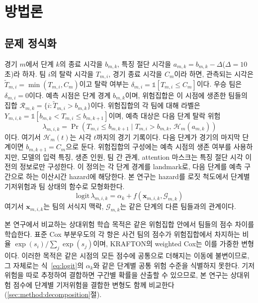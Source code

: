 \section{방법론}
\label{sec:method}


\subsection{문제 정식화}
\label{sec:method:formulation}

경기 $m$에서 단계 $k$의 종료 시각을 $b_{m,k}$, 특징 절단 시각을 $a_{m,k}=b_{m,k}-\Delta$($\Delta=10$초)라 하자.
팀 $i$의 탈락 시각을 $T_{m,i}$, 경기 종료 시각을 $C_m$이라 하면, 관측되는 시각은 $\widetilde T_{m,i}=\min(T_{m,i},C_m)$이고 탈락 여부는 $\delta_{m,i}=\mathbb{1}[T_{m,i}\le C_m]$이다. 우승 팀은 $\delta_{m,i}=0$이다.
예측 시점은 단계 경계 $b_{m,k}$이며, 위험집합은 이 시점에 생존한 팀들의 집합 $\mathcal{R}_{m,k}=\{i:\widetilde T_{m,i}>b_{m,k}\}$이다.
위험집합의 각 팀에 대해 라벨은 $Y_{m,i,k}=\mathbb{1}[b_{m,k}<T_{m,i}\le b_{m,k+1}]$이며, 예측 대상은 다음 단계 탈락 위험
\begin{equation}
\lambda_{m,i,k}=\Pr\!\left(T_{m,i}\le b_{m,k+1} \mid T_{m,i}>b_{m,k},\,\mathcal{H}_{m}(a_{m,k})\right)
\label{eq:hazard}
\end{equation}
이다. 여기서 $\mathcal{H}_{m}(t)$는 시각 $t$까지의 경기 기록이다.
다음 단계가 경기의 마지막 단계이면 $b_{m,k+1}=C_m$으로 둔다.
위험집합의 구성에는 예측 시점의 생존 여부를 사용하지만, 모델의 입력 특징, 생존 인원, 팀 간 관계, attention 마스크는 특징 절단 시각 이전의 정보로만 구성한다.
이 정의는 각 단계 경계를 landmark로, 다음 단계를 예측 구간으로 하는 이산시간 hazard에 해당한다.
본 연구는 hazard를 로짓 척도에서 단계별 기저위험과 팀 상태의 함수로 모형화한다.
\begin{equation}
\mathrm{logit}\,\lambda_{m,i,k}=\alpha_k+f(\mathbf{x}_{m,i,k},\mathcal{G}_{m,k})
\label{eq:logit}
\end{equation}
여기서 $\mathbf{x}_{m,i,k}$는 팀의 서식지 맥락, $\mathcal{G}_{m,k}$는 같은 단계의 다른 팀들과의 관계이다.

본 연구에서 비교하는 상대위험 학습 목적은 같은 위험집합 안에서 팀들의 점수 차이를 학습한다.
표준 Cox 부분우도의 각 항은 사건 팀의 점수가 위험집합에서 차지하는 비율 $\exp(s_i)/\sum_{j}\exp(s_j)$이며, KRAFTON의 weighted Cox는 이를 가중한 변형이다.
이러한 목적은 같은 시점의 모든 점수에 공통으로 더해지는 이동에 불변이므로, 그 자체로는 식~\eqref{eq:logit}의 $\alpha_k$와 같은 단계별 공통 위험 수준을 식별하지 못한다.
기저위험을 따로 추정하여 결합하면 구간별 확률을 산출할 수 있으므로, 본 연구는 상대위험 점수에 단계별 기저위험을 결합한 변형도 함께 비교한다(\ref{sec:method:decomposition}절).


